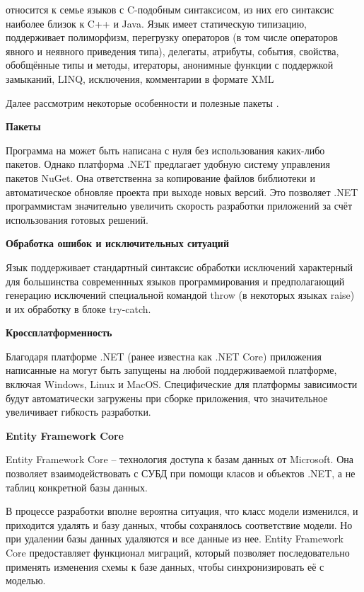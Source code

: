 \csharp относится к семье языков с C-подобным синтаксисом, из них его синтаксис наиболее близок к C++ и Java. Язык имеет статическую типизацию, поддерживает полиморфизм, перегрузку операторов (в том числе операторов явного и неявного приведения типа), делегаты, атрибуты, события, свойства, обобщённые типы и методы, итераторы, анонимные функции с поддержкой замыканий, LINQ, исключения, комментарии в формате XML

Далее рассмотрим некоторые особенности и полезные пакеты \csharp.

\bigskip
\textbf{Пакеты}

Программа на \csharp может быть написана с нуля без использования каких-либо пакетов. Однако платформа .NET предлагает удобную систему управления пакетов NuGet. Она ответственна за копирование файлов библиотеки и автоматическое обновляе проекта при выходе новых версий. Это позволяет .NET программистам значительно увеличить скорость разработки приложений за счёт использования готовых решений.

\bigskip
\textbf{Обработка ошибок и исключительных ситуаций}

Язык \csharp поддерживает стандартный синтаксис обработки исключений характерный для большинства современнных языков программирования и предполагающий генерацию исключений специальной командой throw (в некоторых языках raise) и их обработку в блоке try-catch.

\bigskip
\textbf{Кроссплатформенность}

Благодаря платформе .NET (ранее известна как .NET Core) приложения написанные на \csharp могут быть запущены на любой поддерживаемой платформе, включая Windows, Linux и MacOS. Специфические для платформы зависимости будут автоматически загружены при сборке приложения, что значительное увеличивает гибкость разработки.

\bigskip
\textbf{Entity Framework Core}

Entity Framework Core – технология доступа к базам данных от Microsoft. Она позволяет взаимодействовать с СУБД при помощи класов и объектов .NET, а не таблиц конкретной базы данных.

В процессе разработки вполне вероятна ситуация, что класс модели изменился, и приходится удалять и базу данных, чтобы сохранялось соответствие модели. Но при удалении базы данных удаляются и все данные из нее. Entity Framework Core предоставляет функционал миграций, который позволяет последовательно применять изменения схемы к базе данных, чтобы синхронизировать её с моделью.



